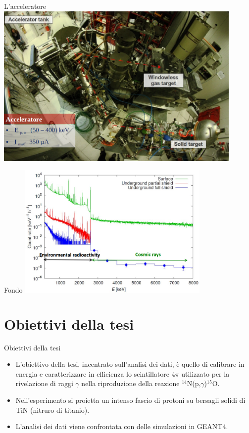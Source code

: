 \documentclass [xcolor=svgnames] {beamer}
\begin{document}
	\begin{frame}{L'acceleratore}
		\centering
		\includegraphics[width=0.9\textwidth]{img/LUNA2.png}
	\end{frame}
	
	\begin{frame}{Fondo}
		\centering
		\includegraphics[width=0.7\textwidth]{img/noise.png}
	\end{frame}
	
	\section{Obiettivi della tesi}
	\begin{frame}{Obiettivi della tesi}
		\begin{itemize}
			\item<1-> L'obiettivo della tesi, incentrato sull'analisi dei dati, è quello di calibrare in energia e caratterizzare in efficienza lo scintillatore $4\pi$ utilizzato per la rivelazione di raggi $\gamma$ nella riproduzione della reazione $^{14}$N(p,$\gamma$)$^{15}$O. 
			\item<2-> Nell'esperimento si proietta un intenso fascio di protoni su bersagli solidi di TiN (nitruro di titanio).  
			\item<3-> L'analisi dei dati viene confrontata con delle simulazioni in GEANT4.
		\end{itemize}
	\end{frame}
\end{document}
